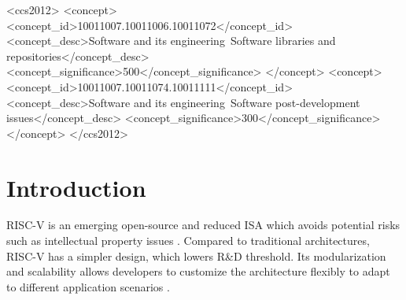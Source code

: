\documentclass[sigconf,screen,review]{acmart}
\begin{document}
\begin{CCSXML}
<ccs2012>
    <concept>
        <concept_id>10011007.10011006.10011072</concept_id>
        <concept_desc>Software and its engineering~Software libraries and repositories</concept_desc>
        <concept_significance>500</concept_significance>
        </concept>
    <concept>
        <concept_id>10011007.10011074.10011111</concept_id>
        <concept_desc>Software and its engineering~Software post-development issues</concept_desc>
        <concept_significance>300</concept_significance>
    </concept>
</ccs2012>
\end{CCSXML}
  





\maketitle

\section{Introduction}
RISC-V is an emerging open-source and reduced ISA which avoids potential risks such as intellectual property issues \cite{2014The}.
Compared to traditional architectures, RISC-V has a simpler design, which lowers R\&D threshold.
Its modularization and scalability allows developers to customize the architecture flexibly to adapt to different application scenarios \cite{osti_1560132}.
\end{document}
